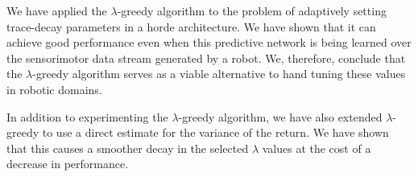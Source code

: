 \documentclass[../main.tex]{subfiles}
\begin{document}
We have applied the {$\lambda$}-greedy algorithm to the problem of adaptively setting trace-decay parameters in a horde architecture. We have shown that it can achieve good performance even when this predictive network is being learned over the sensorimotor data stream generated by a robot. We, therefore, conclude that the {$\lambda$}-greedy algorithm serves as a viable alternative to hand tuning these values in robotic domains.

In addition to experimenting the {$\lambda$}-greedy algorithm, we have also extended {$\lambda$}-greedy to use a direct estimate for the variance of the return. We have shown that this causes a smoother decay in the selected $\lambda$ values at the cost of a decrease in performance.
\end{document}

